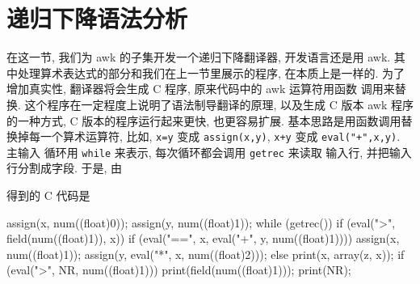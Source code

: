 \section{递归下降语法分析}
\label{sec:recursive_descent_parsing}

在这一节, 我们为 awk 的子集开发一个递归下降翻译器, 开发语言还是用 awk.
其中处理算术表达式的部分和我们在上一节里展示的程序, 在本质上是一样的.
为了增加真实性, 翻译器将会生成 C 程序, 原来代码中的 awk 运算符用函数
调用来替换. 这个程序在一定程度上说明了语法制导翻译的原理, 以及生成
C 版本 awk 程序的一种方式, C 版本的程序运行起来更快, 也更容易扩展.
基本思路是用函数调用替换掉每一个算术运算符, 比如, \texttt{x=y} 变成
\texttt{assign(x,y)}, \texttt{x+y} 变成 \texttt{eval("+",x,y)}. 主输入
循环用 \texttt{while} 来表示, 每次循环都会调用 \texttt{getrec} 来读取
输入行, 并把输入行分割成字段. 于是, 由
得到的 C 代码是
\begin{file}
    assign(x, num((float)0));
    assign(y, num((float)1));
    while (getrec()) {
            if (eval(">", field(num((float)1)), x)) {
                    if (eval("==", x, eval("+", y, num((float)1)))) {
                            assign(x, num((float)1));
                            assign(y, eval("*", x, num((float)2)));
                    } else {
                            print(x, array(z, x));
                    }
            }
            if (eval(">", NR, num((float)1))) {
                    print(field(num((float)1)));
            }
    }
    print(NR);
\end{file}

